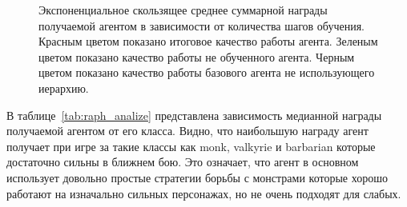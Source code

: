 \begin{figure}[ht]
\caption{Экспоненциальное скользящее среднее суммарной награды получаемой агентом в зависимости от количества шагов обучения. Красным цветом показано итоговое качество работы агента. Зеленым цветом показано качество работы не обученного агента. Черным цветом показано качество работы базового агента не использующего иерархию.}
    \label{fig:raph_train}
\end{figure}


В таблице~\ref{tab:raph_analize} представлена зависимость медианной награды получаемой агентом от его класса. Видно, что наибольшую награду агент получает при игре за такие классы как monk, valkyrie и barbarian которые достаточно сильны в ближнем бою. Это означает, что агент в основном использует довольно простые стратегии борьбы с монстрами которые хорошо работают на изначально сильных персонажах, но не очень подходят для слабых. 


